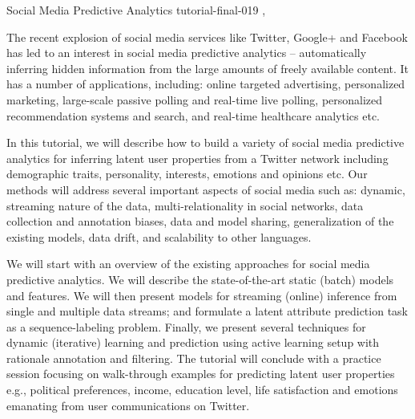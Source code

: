 \begin{tutorial}
  {Social Media Predictive Analytics}
  {tutorial-final-019}
  {\daydateyear, \tutorialafternoontime}
  {\TutLocD}

  The recent explosion of social media services like Twitter, Google+
  and Facebook has led to an interest in social media predictive
  analytics – automatically inferring hidden information from the
  large amounts of freely available content. It has a number of
  applications, including: online targeted advertising, personalized
  marketing, large-scale passive polling and real-time live polling,
  personalized recommendation systems and search, and real-time
  healthcare analytics etc.

  In this tutorial, we will describe how to build a variety of social
  media predictive analytics for inferring latent user properties from
  a Twitter network including demographic traits, personality,
  interests, emotions and opinions etc. Our methods will address
  several important aspects of social media such as: dynamic,
  streaming nature of the data, multi-relationality in social
  networks, data collection and annotation biases, data and model
  sharing, generalization of the existing models, data drift, and
  scalability to other languages.

  We will start with an overview of the existing approaches for social
  media predictive analytics. We will describe the state-of-the-art
  static (batch) models and features. We will then present models for
  streaming (online) inference from single and multiple data streams;
  and formulate a latent attribute prediction task as a
  sequence-labeling problem. Finally, we present several techniques
  for dynamic (iterative) learning and prediction using active
  learning setup with rationale annotation and filtering. The tutorial
  will conclude with a practice session focusing on walk-through
  examples for predicting latent user properties e.g., political
  preferences, income, education level, life satisfaction and emotions
  emanating from user communications on Twitter.

\end{tutorial}
